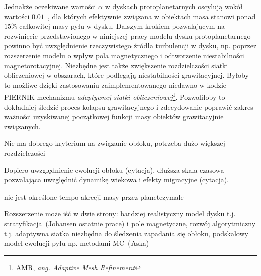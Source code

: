Jednakże oczekiwane wartości $\alpha$ w dyskach protoplanetarnych oscylują wokół
wartości $0.01$~\cite{FD11}, dla których efektywnie związana w obiektach masa
stanowi ponad $15\%$ całkowitej masy pyłu w dysku. Dalszym krokiem pozwalającym
na rozwinięcie przedstawionego w niniejszej pracy modelu dysku protoplanetarnego
powinno być uwzględnienie rzeczywistego źródła turbulencji w dysku, np. poprzez
rozszerzenie modelu o wpływ pola magnetycznego i odtworzenie niestabilności
magnetorotacyjnej. Niezbędne jest także zwiększenie rozdzielczości siatki
obliczeniowej w obszarach, które podlegają niestabilności grawitacyjnej. Byłoby
to możliwe dzięki zastosowaniu zaimplementowanego niedawno w kodzie \textsc{PIERNIK}
mechanizmu \emph{adaptywnej siatki obliczeniowej}\footnote{AMR, \emph{ang.
Adaptive Mesh Refinement}}. Pozwoliłoby to dokładniej śledzić proces kolapsu
grawitacyjnego i zdecydowanie poprawić zakres ważności uzyskiwanej początkowej
funkcji masy obiektów grawitacyjnie związanych.

Nie ma dobrego kryterium na związanie obłoku, potrzeba dużo większej rozdzielczości

Dopiero uwzględnienie ewolucji obłoku (cytacja), dłuższa skala czasowa
pozwalająca uwzględnić dynamikę wiekowa i efekty migracyjne (cytacja).

\par nie jest określone tempo akrecji masy przez planetezymale

Rozszerzenie może iść w dwie strony: bardziej realistyczny model dysku t.j.
stratyfikacja~(Johansen ostatnie prace) i pole magnetyczne, rozwój
algorytmiczny t.j. adaptywna siatka niezbędna do śledzenia zapadania się
obłoku, podskalowy model ewolucji pyłu np.  metodami MC~(Aska)


